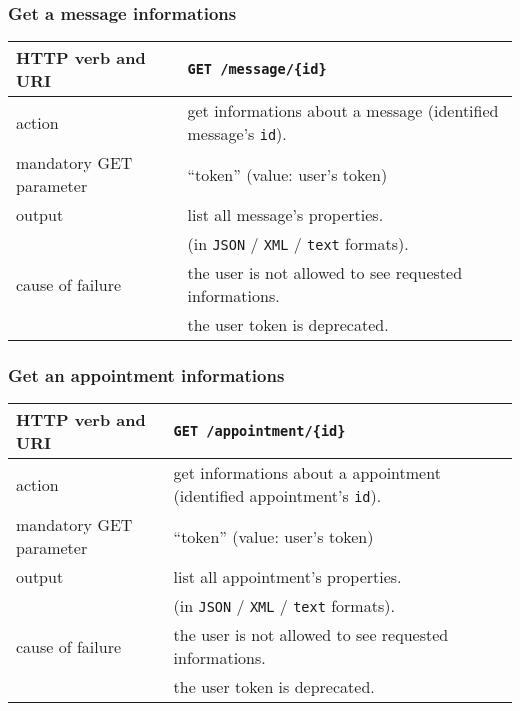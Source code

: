 \subsubsection{Get a message informations}
\begin{tabular}{ | l | l | }
	\hline
	HTTP verb and URI & \texttt{GET /message/\{id\}} \\
	\hline
	action & get informations about a message (identified \via message’s \texttt{id}). \\
	\hline
	mandatory GET parameter & ``token'' (value: user's token) \\
	\hline
	output & list all message's properties.  \\
	\space & (in \texttt{JSON} / \texttt{XML} / \texttt{text} formats). \\
	\hline
	cause of failure & the user is not allowed to see requested informations. \\
	\space & the user token is deprecated. \\
	\hline
\end{tabular}
\newline

\subsubsection{Get an appointment informations}
\begin{tabular}{ | l | l | }
	\hline
	HTTP verb and URI & \texttt{GET /appointment/\{id\}} \\
	\hline
	action & get informations about a appointment (identified \via appointment’s \texttt{id}). \\
	\hline
	mandatory GET parameter & ``token'' (value: user's token) \\
	\hline
	output & list all appointment's properties.  \\
	\space & (in \texttt{JSON} / \texttt{XML} / \texttt{text} formats). \\
	\hline
	cause of failure & the user is not allowed to see requested informations. \\
	\space & the user token is deprecated. \\
	\hline
\end{tabular}
\newline

